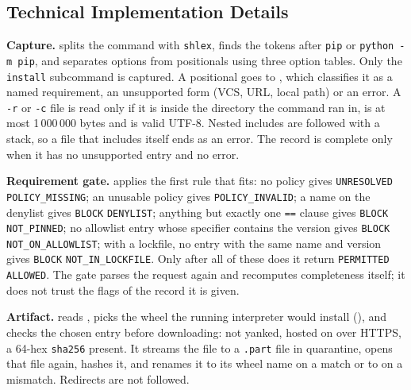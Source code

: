 \subsection{Technical Implementation Details}
\begin{sloppypar}
\textbf{Capture.}  splits the command with \texttt{shlex}, finds the tokens after \texttt{pip} or \texttt{python -m pip}, and separates options from positionals using three option tables. Only the \texttt{install} subcommand is captured. A positional goes to , which classifies it as a named requirement, an unsupported form (VCS, URL, local path) or an error. A \texttt{-r} or \texttt{-c} file is read only if it is inside the directory the command ran in, is at most 1\,000\,000 bytes and is valid UTF-8. Nested includes are followed with a stack, so a file that includes itself ends as an error. The record is complete only when it has no unsupported entry and no error.
\end{sloppypar}

\begin{sloppypar}
\textbf{Requirement gate.}  applies the first rule that fits: no policy gives \texttt{UNRESOLVED} \texttt{POLICY\_MISSING}; an unusable policy gives \texttt{POLICY\_INVALID}; a name on the denylist gives \texttt{BLOCK} \texttt{DENYLIST}; anything but exactly one \texttt{==} clause gives \texttt{BLOCK} \texttt{NOT\_PINNED}; no allowlist entry whose specifier contains the version gives \texttt{BLOCK} \texttt{NOT\_ON\_ALLOWLIST}; with a lockfile, no entry with the same name and version gives \texttt{BLOCK} \texttt{NOT\_IN\_LOCKFILE}. Only after all of these does it return \texttt{PERMITTED} \texttt{ALLOWED}. The gate parses the request again and recomputes completeness itself; it does not trust the flags of the record it is given.
\end{sloppypar}

\begin{sloppypar}
\textbf{Artifact.}  reads , picks the wheel the running interpreter would install (), and checks the chosen entry before downloading: not yanked, hosted on  over HTTPS, a 64-hex \texttt{sha256} present. It streams the file to a \texttt{.part} file in quarantine, opens that file again, hashes it, and renames it to its wheel name on a match or to  on a mismatch. Redirects are not followed.
\end{sloppypar}

